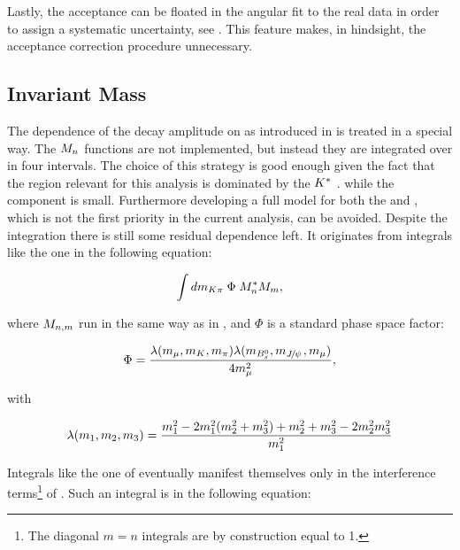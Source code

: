 Lastly, the acceptance can be floated in the angular fit to the real data in order to assign a systematic uncertainty, see .
This feature makes, in hindsight, the acceptance correction procedure unnecessary.


\subsection{\Kpi Invariant Mass}
\label{Kpi_Invariant_mass}

The dependence of the \BJpsiKpi decay amplitude on \mkpi as introduced in  is treated in a special way.
The $\mKpiAmp$ functions are not implemented, but instead they are integrated over in four intervals. The choice of this strategy
is good enough given the fact that the \mkpi region relevant for this analysis is dominated by the $\Kstar$ \pwave.
while the \swave component is small. Furthermore developing a full model for both the \pwave and \swave, which is not the
first priority in the current analysis, can be avoided. Despite the \mkpi integration there is still some residual dependence left.
It originates from integrals like the one in the following equation:

\begin{equation}
  \label{spIntegrals}
  \int d\mkpi \; \Phi \; \mKpiAmp^* \mKpiAmp[m],
\end{equation}

\noindent where $\mKpiAmp[n,m]$ run in the same way as in , and $\Phi$ is a standard
phase space factor:

\begin{equation}
  \centering
  \Phi = \frac{\lambda(m_\mmu,m_\kaon,m_\pion) \lambda(m_{\Bs},m_\jpsi,m_\mmu)}{ 4 m_\mmu^2},
  \label{csp_ph_sp_factor}
\end{equation}

\noindent with

\begin{equation}
  \centering
  \lambda(m_1,m_2,m_3) = \frac{m_1^2 - 2m_1^2(m_2^2 + m_3^2) + m_2^2 + m_3^2 - 2m_2^2m_3^2 } {m_1^2} \nonumber
  \label{csp_ph_sp_factor_def}
\end{equation}

Integrals like the one of  eventually manifest themselves only in the \spwave interference
terms\footnote{The diagonal $m=n$ integrals are by construction equal to 1.} of .
Such an integral is in the following equation:

